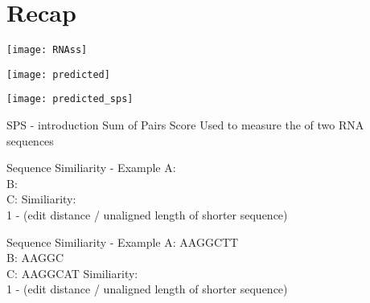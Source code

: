 \section{Recap}

\begin{frame}[c]{}
    \center
    \texttt{[image: RNAss]}

\end{frame}

\begin{frame}[c]{}
    \center
    \texttt{[image: predicted]}
\end{frame}


\begin{frame}[c]{}
    \center
    \texttt{[image: predicted\_sps]}
\end{frame}


\begin{frame}[c]{SPS - introduction}
    Sum of Pairs Score
    \newline
    \newline
    \pause
    Used to measure the  of two RNA sequences
\end{frame}


\begin{frame}[c]{Sequence Similiarity - Example}
    A: \only<4-5>{AAGGC} \\
    B:  \\
    C:  \newline
    \newline
    Similiarity:  \\
    1 - (edit distance / unaligned length of shorter sequence)
\end{frame}


\begin{frame}[c]{Sequence Similiarity - Example}
    A: {\color{ForestGreen}AAGGC}{\color{red}T}{\color{ForestGreen}T} \\
    B: AAGGC \\
    C: {\color{ForestGreen}AAGGC}{\color{red}A}{\color{ForestGreen}T} \newline
    \newline
    Similiarity:  \\
    1 - (edit distance / unaligned length of shorter sequence)
\end{frame}


